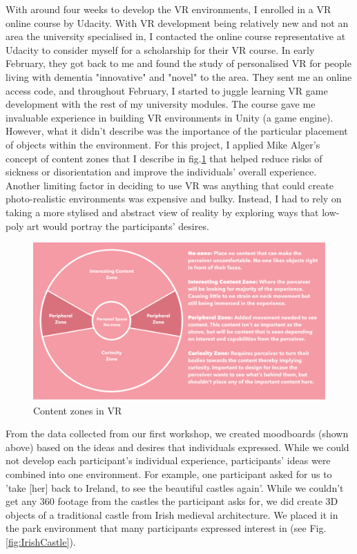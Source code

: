 With around four weeks to develop the VR environments, I enrolled in a VR online course by Udacity. With VR development being relatively new and not an area the university specialised in, I contacted the online course representative at Udacity to consider myself for a scholarship for their VR course. In early February, they got back to me and found the study of personalised VR for people living with dementia "innovative" and "novel" to the area. They sent me an online access code, and throughout February, I started to juggle learning VR game development with the rest of my university modules. The course gave me invaluable experience in building VR environments in Unity (a game engine). However, what it didn't describe was the importance of the particular placement of objects within the environment. For this project, I applied Mike Alger's \citep{alger_visual_2015} concept of content zones that I describe in fig.\ref{fig:ContentZone} that helped reduce risks of sickness or disorientation and improve the individuals' overall experience. Another limiting factor in deciding to use VR was anything that could create photo-realistic environments was expensive and bulky. Instead, I had to rely on taking a more stylised and abstract view of reality by exploring ways that low-poly art would portray the participants' desires.

\begin{figure}
\centering
\includegraphics[width=.8\linewidth]{Images/ChapterFour/ContentZones.png}
\caption{Content zones in VR}
\label{fig:ContentZone}
\end{figure}

From the data collected from our first workshop, we created moodboards (shown above) based on the ideas and desires that individuals expressed. While we could not develop each participant's individual experience, participants' ideas were combined into one environment. For example, one participant asked for us to 'take [her] back to Ireland, to see the beautiful castles again'. While we couldn’t get any 360 footage from the castles the participant asks for, we did create 3D objects of a traditional castle from Irish medieval architecture. We placed it in the park environment that many participants expressed interest in (see Fig.\ref{fig:IrishCastle}).


